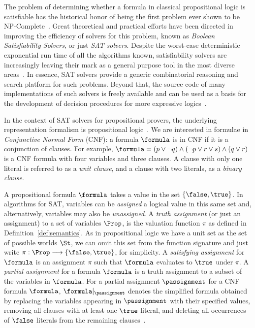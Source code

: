 The problem of determining whether a formula in classical propositional logic is
satisfiable has the historical honor of being the first problem ever shown to be
NP-Complete~\cite{Cook}. Great theoretical and practical efforts have been
directed in improving the efficiency of solvers for this problem, known as
\emph{Boolean Satisfiability Solvers}, or just \emph{SAT solvers}. Despite the
worst-case deterministic exponential run time of all the algorithms known,
satisfiability solvers are increasingly leaving their mark as a general purpose
tool in the most diverse areas~\cite{satchapter}. In essence, SAT solvers
provide a generic combinatorial reasoning and search platform for such problems.
Beyond that, the source code of many implementations of such solvers is freely
available and can be used as a basis for the development of decision procedures
for more expressive logics~\cite{giunchiglia2002sat}.

In the context of SAT solvers for propositional provers, the underlying
representation formalism is propositional logic~\cite{satchapter}. We are
interested in formulae in \emph{Conjunctive Normal Form} (CNF): a formula
$\formula$ is in CNF if it is a conjunction of clauses. For example, $\formula =
(p \lor \neg q) \land (\neg p \lor r \lor s) \land (q \lor r)$ is a CNF formula
with four variables and three clauses. A clause with only one literal is
referred to as a \emph{unit clause}, and a clause with two literals, as a
\emph{binary clause}.

A propositional formula $\formula$ takes a value in the set $\{\false, \true\}$. In
algorithms for SAT, variables can be \emph{assigned} a logical value in this same
set and, alternatively, variables may also be \emph{unassigned}. A \emph{truth
assignment} (or just an assignment) to a set of variables $\Prop$, is the valuation
function $\pi$ as defined in Definition~\ref{def:semantics}. As in propositional
logic we have a unit set as the set of possible worlds $\St$, we can omit this
set from the function signature and just write $\pi : \Prop \longrightarrow
\{\false,\true\}$, for simplicity. A \emph{satisfying assignment} for $\formula$
is an assignment $\pi$ such that $\formula$ evaluates to $\true$ under $\pi$.  A
\emph{partial assignment} for a formula $\formula$ is a truth assignment to a
subset of the variables in $\formula$. For a partial assignment $\passignment$
for a CNF formula $\formula$, $\formula|_\passignment$ denotes the simplified
formula obtained by replacing the variables appearing in $\passignment$ with
their specified values, removing all clauses with at least one $\true$ literal,
and deleting all occurrences of $\false$ literals from the remaining
clauses~\cite{satchapter}.   


